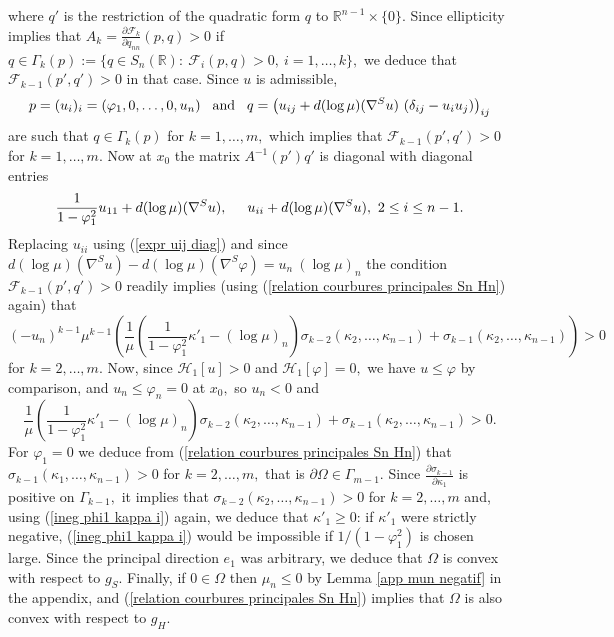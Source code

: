 \documentclass[10pt,reqno,oneside]{amsart}
\theoremstyle{definition}
\theoremstyle{remark}
\newcommand{\R}{\mathbb{R}}
\begin{document}
where $q'$ is the restriction of the quadratic form $q$ to $\R^{n-1}\times\{0\}$. Since ellipticity implies that $A_k=\frac{\partial\mathcal{F}_k}{\partial q_{nn}}(p,q)>0$ if $q\in\Gamma_k(p):=\{q\in S_n(\R):\ \mathcal{F}_i(p,q)>0,\ i=1,\ldots,k\},$ we deduce that $\mathcal{F}_{k-1}(p',q')>0$ in that case. Since $u$ is admissible, 
$$p=(u_i)_i=(\varphi_1,0,\ldots,0,u_n)\hspace{.3cm}\mbox{and}\hspace{.3cm}q=\left(u_{ij}+d(\log\mu)(\nabla^S u)\ (\delta_{ij}-u_iu_j)\right)_{ij}$$
are such that $q\in \Gamma_k(p)$ for $k=1,\ldots,m,$ which implies that $\mathcal{F}_{k-1}(p',q')>0$ for $k=1,\ldots,m.$ Now at $x_0$ the matrix $A^{-1}(p')q'$ is diagonal with diagonal entries
$$\frac{1}{1-\varphi_1^2}u_{11}+d(\log\mu)(\nabla^S u),\hspace{.5cm}u_{ii}+d(\log\mu)(\nabla^S u),\ 2\leq i\leq n-1.$$
Replacing $u_{ii}$ using (\ref{expr uij diag}) and since $d(\log\mu)(\nabla^S u)-d(\log\mu)(\nabla^S\varphi)=u_n\ (\log\mu)_n$ the condition $\mathcal{F}_{k-1}(p',q')>0$ readily implies (using (\ref{relation courbures principales Sn Hn}) again) that
$$(-u_n)^{k-1}\mu^{k-1}\left(\frac{1}{\mu}\left(\frac{1}{1-\varphi_1^2}\kappa'_1-(\log\mu)_n\right)\sigma_{k-2}(\kappa_2,\ldots,\kappa_{n-1})+\sigma_{k-1}(\kappa_2,\ldots,\kappa_{n-1})\right)>0$$
for $k=2,\ldots,m$. Now, since $\mathcal{H}_1[u]>0$ and $\mathcal{H}_1[\varphi]=0,$ we have $u\leq\varphi$ by comparison, and $u_n\leq\varphi_n=0$ at $x_0,$ so $u_n<0$ and
\begin{equation}\label{ineg phi1 kappa i}
\frac{1}{\mu}\left(\frac{1}{1-\varphi_1^2}\kappa'_1-(\log\mu)_n\right)\sigma_{k-2}(\kappa_2,\ldots,\kappa_{n-1})+\sigma_{k-1}(\kappa_2,\ldots,\kappa_{n-1})>0.
\end{equation}
For $\varphi_1=0$ we deduce from (\ref{relation courbures principales Sn Hn}) that $\sigma_{k-1}(\kappa_1,\ldots,\kappa_{n-1})>0$ for $k=2,\ldots,m,$ that is $\partial\Omega\in\Gamma_{m-1}.$ Since $\frac{\partial\sigma_{k-1}}{\partial\kappa_1}$ is positive on $\Gamma_{k-1},$ it implies that $\sigma_{k-2}(\kappa_2,\ldots,\kappa_{n-1})>0$ for $k=2,\ldots,m$ and, using (\ref{ineg phi1 kappa i}) again, we deduce that $\kappa'_1\geq 0$: if $\kappa'_1$ were strictly negative, (\ref{ineg phi1 kappa i}) would be impossible if $1/(1-\varphi_1^2)$ is chosen large. Since the principal direction $e_1$ was arbitrary, we deduce that $\Omega$ is convex with respect to $g_S.$ Finally, if $0\in\Omega$ then $\mu_n\leq 0$ by Lemma \ref{app mun negatif} in the appendix, and (\ref{relation courbures principales Sn Hn}) implies that $\Omega$ is also convex with respect to $g_H.$
\end{document}
